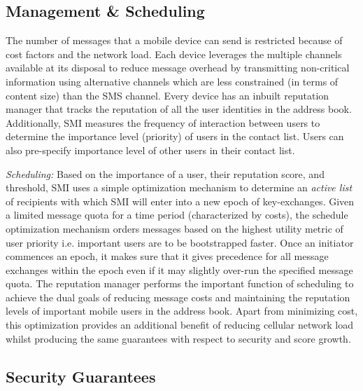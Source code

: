 \documentclass[letterpaper,twocolumn]{sig-alternate}
\begin{document}
\vspace{2mm}

{\large \centerline{\textbf{}}}

\vspace{2mm}

{\large \centerline{\textbf{}}}

\vspace{3mm}



\subsection{Management \& Scheduling}
\label{manager}

The number of messages that a mobile device can send is restricted because of cost factors and the network load. Each device leverages the multiple channels available at its disposal to reduce message overhead by transmitting non-critical information using alternative channels which are less constrained (in terms of content size) than the SMS channel. Every device has an inbuilt reputation manager that tracks the reputation of all the user identities in the address book. Additionally, SMI measures the frequency of interaction between users to determine the importance level (priority) of users in the contact list. Users can also pre-specify importance level of other users in their contact list. 

{\em Scheduling:} Based on the importance of a user, their reputation score, and threshold, SMI uses a simple optimization mechanism to determine an {\em active list} of recipients with which SMI will enter into a new epoch of key-exchanges. Given a limited message quota for a time period (characterized by costs), the schedule optimization mechanism orders messages based on the highest utility metric of user priority i.e. important users are to be bootstrapped faster. Once an initiator commences an epoch, it makes sure that it gives precedence for all message exchanges within the epoch even if it may slightly over-run the specified message quota. The reputation manager performs the important function of scheduling to achieve the dual goals of reducing message costs and maintaining the reputation levels of important mobile users in the address book. Apart from minimizing cost, this optimization provides an additional benefit of reducing cellular network load whilst producing the same guarantees with respect to security and score growth. 

\subsection{Security Guarantees}
\label{threshold}
\end{document}
